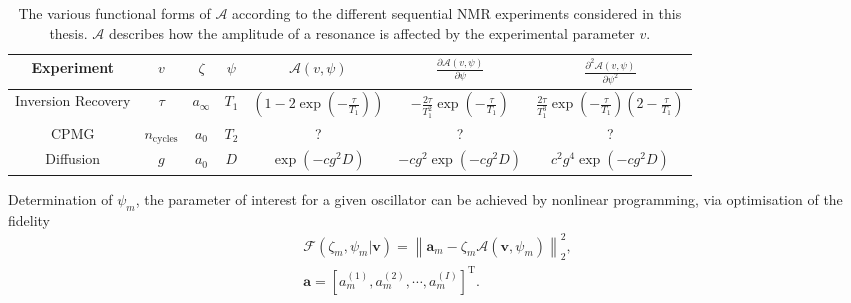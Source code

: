 \begin{table}
    \begin{center}
        \begin{tabular}{ccccccc}
            \hline
            Experiment &
            $v$ &
            $\zeta$ &
            $\psi$ &
            $\mathcal{A}(v, \psi)$ &
            $\frac{\partial \mathcal{A}(v, \psi)}{\partial \psi}$ &
            $\frac{\partial^2 \mathcal{A}(v, \psi)}{\partial \psi^2}$ \\ \hline
            Inversion Recovery &
            $\tau$ &
            $a_{\infty}$ &
            $T_1$ &
            $\left(1 - 2 \exp \left(-\frac{\tau}{T_{1}}\right)\right)$ &
            $-\frac{2 \tau}{T_1^2} \exp\left(-\frac{\tau}{T_1}\right)$ &
            $\frac{2 \tau}{T_1^3} \exp\left(-\frac{\tau}{T_1}\right)\left(2 - \frac{\tau}{T_1}\right)$\\
            CPMG &
            $n_{\textrm{cycles}}$ &
            $a_0$ &
            $T_2$ &
            ? &
            ? &
            ? \\
            Diffusion &
            $g$ &
            $a_0$ &
            $D$ &
            $\exp\left(-c g^2 D\right)$ &
            $-c g^2 \exp\left(-c g^2 D\right)$ &
            $c^2 g^4 \exp\left(-c g^2 D\right)$ \\
            \hline
       \end{tabular}
       \caption{
           The various functional forms of $\mathcal{A}$ according to the
           different sequential NMR experiments considered in this thesis.
           $\mathcal{A}$ describes how the amplitude of a resonance is affected
           by the experimental parameter $v$.
       }
       \label{tab:seq_equations}
    \end{center}
\end{table}

Determination of $\psi_m$, the parameter of interest for a given oscillator can be achieved by nonlinear programming, via optimisation of the fidelity
\begin{subequations}
    \begin{gather}
        \mathcal{F}\left(\zeta_m, \psi_m | \symbf{v}\right) =
            \left \lVert \symbf{a}_m - \zeta_m \mathcal{A} \left(\symbf{v},
            \psi_m\right) \right\rVert_2^2,\\
        \symbf{a} = \left[a_m^{(1)}, a_m^{(2)}, \cdots,
            a_m^{(I)}\right]^{\mathrm{T}}.
    \end{gather}
\end{subequations}

